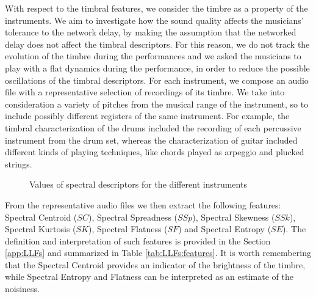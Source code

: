 With respect to the timbral features, we consider the timbre as a property of the instruments. We aim to investigate how the sound quality affects the musicians' tolerance to the network delay, by making the assumption that the networked delay does not affect the timbral descriptors. For this reason, we do not track the evolution of the timbre during the performances and we asked the musicians to play with a flat dynamics during the performance, in order to reduce the possible oscillations of the timbral descriptors. For each instrument, we compose an audio file with a representative selection of recordings of its timbre. We take into consideration a variety of pitches from the musical range of the instrument, so to include possibly different registers of the same instrument. For example, the timbral characterization of the drums included the recording of each percussive instrument from the drum set, whereas the characterization of guitar included different kinds of playing techniques, like chords played as arpeggio and plucked strings. 


\begin{figure}[!tb]
		  \hfil
		  \hfil
		  \hfil
{}  \hfil
		  \hfil
{}  \hfil
	\caption{Values of spectral descriptors for the different instruments}
	\label{fig:NMP:values_spec}
\end{figure}

From the representative audio files we then extract the following features: Spectral Centroid ($SC$), Spectral Spreadness ($SSp$), Spectral Skewness ($SSk$), Spectral Kurtosis ($SK$), Spectral Flatness ($SF$) and Spectral Entropy ($SE$). The definition and interpretation of such features is provided in the Section \ref{app:LLFs} and summarized in Table \ref{tab:LLFs:features}. It is worth remembering that the Spectral Centroid provides an indicator of the brightness of the timbre, while Spectral Entropy and Flatness can be interpreted as an estimate of the noisiness. 

